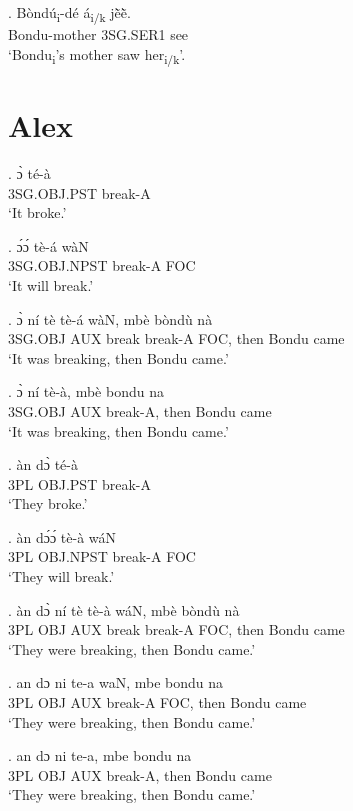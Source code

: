 \documentclass{assets/fieldnotes}
\begin{document}
\exg. B\`{o}nd\'{u}\textsubscript{i}-d\'{e} \'{a}\textsubscript{i/k} jẽ̀ẽ̀. \\
Bondu-mother 3SG.SER1 see \\
`Bondu\textsubscript{i}'s mother saw her\textsubscript{i/k}'.

\section{Alex}

\exg.
ɔ̀             té-à    \\
3SG.OBJ.PST   break-A \\%
`It broke.'


\exg.
ɔ́ɔ́             tè-á      wàN \\
3SG.OBJ.NPST   break-A   FOC \\%
`It will break.'

\exg.
ɔ̀         ní    tè      tè-á      wàN,   mbè    bòndù   nà   \\
3SG.OBJ   AUX   break   break-A   FOC,   then   Bondu   came \\%
`It was breaking, then Bondu came.'

\exg.
ɔ̀         ní    tè-à,      mbè    bondu   na   \\
3SG.OBJ   AUX   break-A,   then   Bondu   came \\%
`It was breaking, then Bondu came.'

\exg.
àn    dɔ̀        té-à    \\
3PL   OBJ.PST   break-A \\%
`They broke.'

\exg.
àn    dɔ́ɔ́        tè-à      wáN \\
3PL   OBJ.NPST   break-A   FOC \\%
`They will break.'

\exg.
àn    dɔ̀    ní    tè      tè-à      wáN,   mbè    bòndù   nà   \\
3PL   OBJ   AUX   break   break-A   FOC,   then   Bondu   came \\%
`They were breaking, then Bondu came.'

\exg.
an    dɔ    ni    te-a      waN,   mbe    bondu   na   \\
3PL   OBJ   AUX   break-A   FOC,   then   Bondu   came \\%
`They were breaking, then Bondu came.'

\exg.
an    dɔ    ni    te-a,      mbe    bondu   na   \\
3PL   OBJ   AUX   break-A,   then   Bondu   came \\%
`They were breaking, then Bondu came.'
\end{document}

